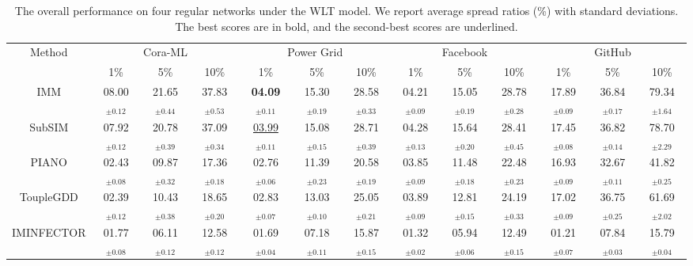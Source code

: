 \begin{table*}[!ht]
\begin{center}
\centering
\caption{The overall performance on four regular networks under the WLT model. We report average spread ratios (\%) with standard deviations. The best scores are in bold, and the second-best scores are underlined.}
\resizebox{\textwidth}{!} {
\begin{tabular}{c ccc ccc ccc ccc } 
\toprule
\multirow{2}{*}{Method} 
        & \multicolumn{3}{c}{Cora-ML} 
        & \multicolumn{3}{c}{Power Grid} 
        & \multicolumn{3}{c}{Facebook}
        & \multicolumn{3}{c}{GitHub} \\ 
        \cmidrule{2-13}

    & 1\% & 5\% & 10\% 
    & 1\% & 5\% & 10\%
    & 1\% & 5\% & 10\%
    & 1\% & 5\% & 10\%  \\
\midrule  

IMM
    & 08.00$_{\pm0.12}$ & 21.65$_{\pm0.44}$ & 37.83$_{\pm0.53}$
    & \textbf{04.09}$_{\pm0.11}$ & 15.30$_{\pm0.19}$ & 28.58$_{\pm0.33}$ 
    & 04.21$_{\pm0.09}$ & 15.05$_{\pm0.19}$ & 28.78$_{\pm0.28}$ 
    & 17.89$_{\pm0.09}$ & 36.84$_{\pm0.17}$ & 79.34$_{\pm1.64}$\\

SubSIM
    & 07.92$_{\pm0.12}$ & 20.78$_{\pm0.39}$ & 37.09$_{\pm0.34}$ 
    & \underline{03.99}$_{\pm0.11}$ & 15.08$_{\pm0.15}$ & 28.71$_{\pm0.39}$ 
    & 04.28$_{\pm0.13}$ & 15.64$_{\pm0.20}$ & 28.41$_{\pm0.45}$ 
    & 17.45$_{\pm0.08}$ & 36.82$_{\pm0.14}$ & 78.70$_{\pm2.29}$\\

\midrule

PIANO
    & 02.43$_{\pm0.08}$ & 09.87$_{\pm0.32}$ & 17.36$_{\pm0.18}$ 
    & 02.76$_{\pm0.06}$ & 11.39$_{\pm0.23}$ & 20.58$_{\pm0.19}$ 
    & 03.85$_{\pm0.09}$ & 11.48$_{\pm0.18}$ & 22.48$_{\pm0.23}$ 
    & 16.93$_{\pm0.09}$ & 32.67$_{\pm0.11}$ & 41.82$_{\pm0.25}$\\
    
ToupleGDD
    & 02.39$_{\pm0.12}$ & 10.43$_{\pm0.38}$ & 18.65$_{\pm0.20}$ 
    & 02.83$_{\pm0.07}$ & 13.03$_{\pm0.10}$ & 25.05$_{\pm0.21}$ 
    & 03.89$_{\pm0.09}$ & 12.81$_{\pm0.15}$ & 24.19$_{\pm0.33}$ 
    & 17.02$_{\pm0.09}$ & 36.75$_{\pm0.25}$ & 61.69$_{\pm2.02}$\\

\midrule

IMINFECTOR
    & 01.77$_{\pm0.08}$ & 06.11$_{\pm0.12}$ & 12.58$_{\pm0.12}$
    & 01.69$_{\pm0.04}$ & 07.18$_{\pm0.11}$ & 15.87$_{\pm0.15}$ 
    & 01.32$_{\pm0.02}$ & 05.94$_{\pm0.06}$ & 12.49$_{\pm0.15}$ 
    & 01.21$_{\pm0.07}$ & 07.84$_{\pm0.03}$ & 15.79$_{\pm0.04}$\\


\end{tabular}}
\end{center}
\end{table*}
